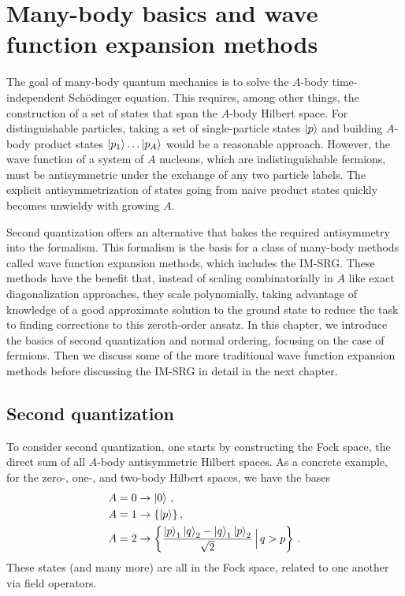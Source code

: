 \chapter{Many-body basics and wave function expansion methods}\label{ch:many_body}

The goal of many-body quantum mechanics is to solve
the $A$-body time-independent Sch\"{o}dinger equation.
This requires, among other things, the construction of a set of states that span
the $A$-body Hilbert space.
For distinguishable particles, taking a set of single-particle states $\ket{p}$
and building $A$-body product states $\ket{p_1}\ldots\ket{p_A}$ would be a reasonable approach.
However, the wave function of a system of $A$ nucleons,
which are indistinguishable fermions,
must be antisymmetric under the exchange of any two particle labels.
The explicit antisymmetrization of states going from naive product states
quickly becomes unwieldy with growing $A$.

Second quantization offers an alternative that bakes the required antisymmetry
into the formalism.
This formalism is the basis for a class of many-body methods
called wave function expansion methods, which includes the IM-SRG.\@
These methods have the benefit that,
instead of scaling combinatorially in $A$ like exact diagonalization approaches,
they scale polynomially,
taking advantage of knowledge of a good approximate solution to the ground state
to reduce the task to finding corrections to this zeroth-order ansatz.
In this chapter, we introduce the basics of second quantization and normal ordering,
focusing on the case of fermions.
Then we discuss some of the more traditional wave function expansion methods
before discussing the IM-SRG in detail in the next chapter.

\section{Second quantization}\label{sec:second_quantization}

To consider second quantization, one starts by constructing the Fock space,
the direct sum of all $A$-body antisymmetric Hilbert spaces.
As a concrete example, for the zero-, one-, and two-body Hilbert spaces, we have the bases
\begin{align}
  A = 0 & \rightarrow \ket{0}\,, \\
  A = 1 & \rightarrow \{\ket{p}\}\,, \\
  A = 2 & \rightarrow \left\{\frac{\ket{p}_{1}\ket{q}_{2} - \ket{q}_{1}\ket{p}_2}{\sqrt{2}} \, \Big| \, q > p \right\}\,.
\end{align}
These states (and many more) are all in the Fock space,
related to one another via field operators.

